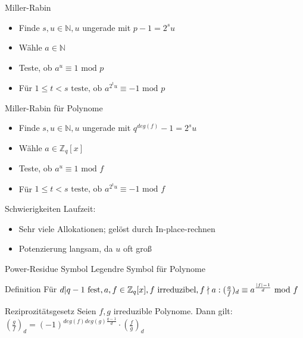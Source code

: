 \documentclass[german,10pt,xcolor=colortbl,compress]{beamer}%
\newcommand{\ZZ}{\mathbb{Z}}
\newcommand{\NN}{\mathbb{N}}
\begin{document}
	\begin{frame}{Miller-Rabin}
		\begin{itemize}
			\item Finde $s,u \in \NN,u $ ungerade mit $p-1=2^su $
			\item Wähle $a \in \NN$ 
			\item Teste, ob $a^u \equiv 1 \text{ mod } p$
			\item Für $1\leq t < s \text{ teste, ob } a^{2^t u} \equiv -1 \text{ mod } p$
		\end{itemize}
	\end{frame}


	\begin{frame}{Miller-Rabin für Polynome}
		\begin{itemize}
			\item Finde $s,u \in \NN,u $ ungerade mit $q^{deg(f)}-1=2^su $
			\item Wähle $a \in \ZZ_q[x]$ 
			\item Teste, ob $a^u \equiv 1 \text{ mod } f$
			\item Für $1\leq t < s \text{ teste, ob } a^{2^t u} \equiv -1 \text{ mod } f$	
		\end{itemize}		
	\end{frame}


	\begin{frame}{Schwierigkeiten}
		Laufzeit: 
		
		\begin{itemize}
			\item Sehr viele Allokationen; gelöst durch In-place-rechnen
			\item Potenzierung langsam, da $u$ oft groß
		\end{itemize}
	\end{frame}


	\begin{frame}{Power-Residue Symbol}
		Legendre Symbol für Polynome 
		\begin{block}{Definition}
			Für $d|q-1 \text{ fest},  a,f \in \ZZ_q[x], f \text{ irreduzibel}, f \nmid a: 
			\newline 	
			(\frac{a}{f})_d  \equiv a^{\frac{|f|-1}{d}} \text{ mod } f$
		\end{block}
	
		\begin{block}{Reziprozitätsgesetz}
			Seien $f,g$ irreduzible Polynome. Dann gilt:
			$(\frac{g}{f})_d=(-1)^{deg(f)deg(g)\frac{q-1}{d}} \cdot (\frac{f}{g})_d $ 				
		\end{block}
	\end{frame}
\end{document}
